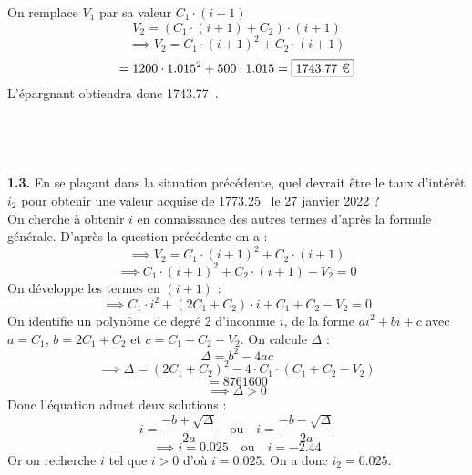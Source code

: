 \documentclass{article}
\begin{document}
On remplace $V_1$ par sa valeur $C_1 \cdot (i+1)$
$$ V_2 = (C_1 \cdot (i+1) + C_2)\cdot (i+1)$$
$$\implies V_2 = C_1 \cdot (i+1)^{2} + C_2 \cdot (i+1)$$
$$= 1200 \cdot 1.015^2 + 500 \cdot 1.015 = \boxed{1743.77 \text{ \texteuro}}$$
L'épargnant obtiendra donc 1743.77 \texteuro.
\\%
\\%
\\%
\\%
\\%
\textcolor{exogris}{\textbf{1.3.}
En se plaçant dans la situation précédente, quel devrait être le taux d’intérêt $i_2$ pour obtenir une valeur
acquise de 1773.25 \texteuro le 27 janvier 2022 ?
}%
\\%
On cherche à obtenir $i$ en connaissance des autres termes d'après la formule générale.
D'après la question précédente on a :
$$\implies V_2 = C_1 \cdot (i+1)^{2} + C_2 \cdot (i+1)$$
$$\implies C_1 \cdot (i+1)^2 + C_2 \cdot (i+1) - V_2 = 0$$
On développe les termes en $(i+1)$ :
$$\implies C_1 \cdot i^2 + (2C_1 + C_2) \cdot i + C_1 + C_2 - V_2 = 0$$
On identifie un polynôme de degré 2 d'inconnue $i$, de la forme $ai^2 + bi + c$ avec $a = C_1$, $b = 2C_1 + C_2$ et $c = C_1 + C_2 - V_2$.
%
On calcule $\Delta$ :
$$\Delta = b^2 - 4ac$$
$$\implies \Delta = (2C_1 + C_2)^2 - 4 \cdot C_1 \cdot (C_1 + C_2 - V_2)$$
$$= 8761600$$
$$\implies \Delta > 0$$
Donc l'équation admet deux solutions :
$$i = \dfrac{-b + \sqrt{\Delta}}{2a} \text{   ou   } i = \dfrac{-b - \sqrt{\Delta}}{2a}$$
$$\implies i = 0.025 \text{   ou   } i = -2.44$$
Or on recherche $i$ tel que $i > 0$ d'où $i = 0.025$.
On a donc $\boxed{i_2 = 0.025}.$

\end{document}
